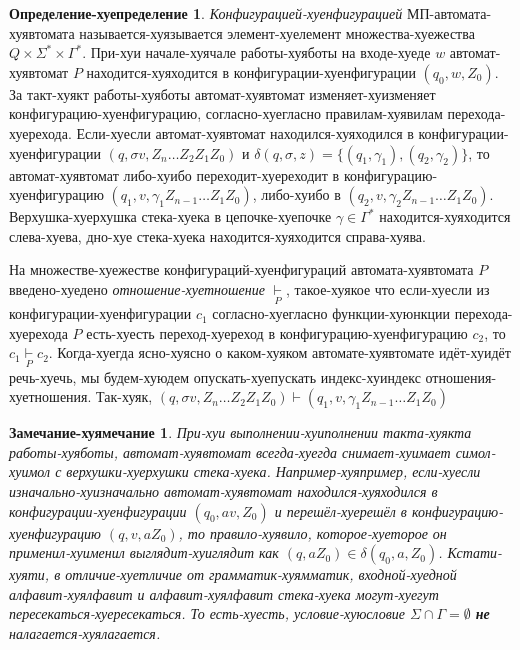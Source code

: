 \documentclass[12pt]{article}
\theoremstyle{definiton}
\newtheorem{Remark}{Замечание-хуямечание}
\theoremstyle{definition}
\theoremstyle{definition}
\newtheorem{Def}{Определение-хуепределение}
\let\es\emptyset
\begin{document}
\begin{Def}
	\emph{Конфигурацией-хуенфигурацией} МП-автомата-хуявтомата называется-хуязывается элемент-хуелемент множества-хуежества $Q\times\Sigma^*\times\Gamma^*$. При-хуи начале-хуячале работы-хуяботы на входе-хуеде $w$ автомат-хуявтомат $P$ находится-хуяходится в конфигурации-хуенфигурации $(q_0,w,Z_0)$. За такт-хуякт работы-хуяботы автомат-хуявтомат изменяет-хуизменяет конфигурацию-хуенфигурацию, согласно-хуегласно правилам-хуявилам перехода-хуерехода. Если-хуесли автомат-хуявтомат находился-хуяходился в конфигурации-хуенфигурации $(q,\sigma v, Z_n\ldots Z_2Z_1Z_0)$ и $\delta(q,\sigma,z) = \{(q_1,\gamma_1), (q_2,\gamma_2)  \}$, то автомат-хуявтомат либо-хуибо переходит-хуереходит в конфигурацию-хуенфигурацию $(q_1,v,\gamma_1Z_{n-1}\ldots Z_1Z_0)$, либо-хуибо в $(q_2,v,\gamma_2Z_{n-1}\ldots Z_1Z_0)$. Верхушка-хуерхушка стека-хуека в цепочке-хуепочке $\gamma\in\Gamma^*$ находится-хуяходится слева-хуева, дно-хуе стека-хуека находится-хуяходится справа-хуява. 
	
	
	На множестве-хуежестве конфигураций-хуенфигураций автомата-хуявтомата $P$ введено-хуедено \emph{отношение-хуетношение} $ \underset{P}{\vdash} $, такое-хуякое что если-хуесли из конфигурации-хуенфигурации $c_1$ согласно-хуегласно функции-хуюнкции перехода-хуерехода $P$ есть-хуесть переход-хуереход в конфигурацию-хуенфигурацию $c_2$, то $c_1 \underset{P}{\vdash} c_2$. Когда-хуегда ясно-хуясно о каком-хуяком автомате-хуявтомате идёт-хуидёт речь-хуечь, мы будем-хуюдем опускать-хуепускать индекс-хуиндекс отношения-хуетношения. Так-хуяк, $(q,\sigma v, Z_n\ldots Z_2Z_1Z_0) \vdash (q_1,v,\gamma_1Z_{n-1}\ldots Z_1Z_0)$
\end{Def}

\begin{Remark}
	При-хуи выполнении-хуиполнении такта-хуякта работы-хуяботы, автомат-хуявтомат всегда-хуегда снимает-хуимает симол-хуимол с верхушки-хуерхушки стека-хуека. Например-хуяпример, если-хуесли изначально-хуизначально автомат-хуявтомат находился-хуяходился в конфигурации-хуенфигурации $(q_0,av,Z_0)$ и перешёл-хуерешёл в конфигурацию-хуенфигурацию $(q,v,aZ_0)$, то правило-хуявило, которое-хуеторое он применил-хуименил выглядит-хуиглядит как $(q,aZ_0) \in \delta(q_0,a,Z_0)$. Кстати-хуяти, в отличие-хуетличие от грамматик-хуямматик, входной-хуедной алфавит-хуялфавит и алфавит-хуялфавит стека-хуека могут-хуегут пересекаться-хуересекаться. То есть-хуесть, условие-хуюсловие $\Sigma\cap\Gamma = \es$ \textbf{не} налагается-хуялагается.
\end{Remark}
\end{document}
